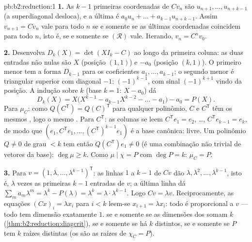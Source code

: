 \begin{solution}{pb:b2:reduction:1}
\textbf{1.} As $k - 1$ primeiras coordenadas de $Cv_n$ são $u_{n+1},
\dots, u_{n+k-1}$ (a superdiagonal desloca), e a última é
$a_0 u_n + \dots + a_{k-1}u_{n+k-1}$. Assim $v_{n+1} = Cv_n$ vale
para todo $n$ se e somente se as últimas coordenadas coincidem para todo $n$, isto é, se e somente se
$(\mathcal R)$ vale. Iterando, $v_n = C^nv_0$.

\textbf{2.} Desenvolva $D_k(X) = \det(XI_k - C)$ ao longo da primeira
coluna: as duas entradas não nulas são $X$ (posição $(1,1)$) e
$-a_0$ (posição $(k,1)$). O primeiro menor tem a forma $D_{k-1}$
para os coeficientes $a_1, \dots, a_{k-1}$; o segundo menor é
triangular superior com diagonal $-1$:  $(-1)^{k-1}$,
com sinal $(-1)^{k+1}$ vindo da posição. A indução sobre $k$
(base $k = 1$: $X - a_0$) dá
\[
D_k(X) = X\bigl(X^{k-1} - a_{k-1}X^{k-2} - \dots - a_1\bigr) -
a_0 = P(X).
\]
Para $\mu_C$: como $Q(C^{\mathsf T}) = Q(C)^{\mathsf T}$ para qualquer
polinômio, $C$ e $C^{\mathsf T}$ têm os mesmos ,
logo o mesmo . Para $C^{\mathsf T}$: as
colunas se leem $C^{\mathsf T}e_1 = e_2$, \dots, $C^{\mathsf
T}e_{k-1} = e_k$, de modo que $(e_1, C^{\mathsf T}e_1, \dots, (C^{\mathsf
T})^{k-1}e_1)$ é a base canônica: livre. Um polinômio $Q
\neq 0$ de grau $< k$ tem então $Q(C^{\mathsf T})e_1 \neq 0$
(é uma combinação não trivial de vetores da base): $\deg\mu \geq
k$. Como $\mu \mid \chi = P$ com $\deg P = k$: $\mu_C = P$.

\textbf{3.} Para $v = (1, \lambda, \dots, \lambda^{k-1})^{\mathsf
T}$: as linhas $1$ a $k-1$ de $Cv$ dão $\lambda, \lambda^2, \dots,
\lambda^{k-1}$, isto é, $\lambda$ vezes as primeiras $k - 1$ entradas
de $v$; a última linha dá $\sum_m a_m\lambda^m = \lambda^k -
P(\lambda) = \lambda^k = \lambda\cdot\lambda^{k-1}$. Logo $Cv =
\lambda v$. Reciprocamente, as equações $(Cx)_i = \lambda x_i$ para
$i < k$ leem-se $x_{i+1} = \lambda x_i$: todo  é
proporcional a $v$ --- todo  tem dimensão exatamente
$1$.  se e somente se as dimensões dos  somam $k$
(\cref{thm:b2:reduction:diagcrit}), se e somente se há $k$ 
distintos, se e somente se $P$ tem $k$ raízes distintas (os  são
as raízes de $\chi_C = P$).


\end{solution}
